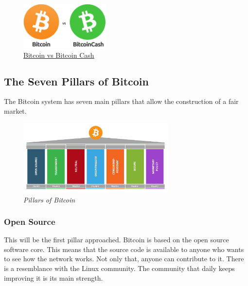 \documentclass{article}
\newcommand\tab[1][1cm]{\hspace*{#1}}
\begin{document}
\begin{figure}[H]
    \begin{center}
        \includegraphics[width=0.4\textwidth]{images/bitcoin_vs_bitcoin_cash.png}
        \caption{\href{https://cdn-images-1.medium.com/max/719/1*kW1BN8Zq8YGR1YYYK2kv9g.png}{\underline{Bitcoin vs Bitcoin Cash}}}
    \end{center}
\end{figure}

\subsection{The Seven Pillars of Bitcoin}

\tab The Bitcoin system has seven main pillars that allow the construction of a fair market. 

\begin{figure}[H]
    \begin{center}
        \includegraphics[width=0.7\textwidth]{images/pillars.png}
        \caption{\textit{Pillars of Bitcoin}}
    \end{center}
\end{figure}

\subsubsection{Open Source}

\tab This will be the first pillar approached. Bitcoin is based on the open source software core. This means that the source code is available to anyone who wants to see how the network works. Not only that, anyone can contribute to it. There is a resemblance with the Linux community. The community that daily keeps improving it is its main strength.
\end{document}
